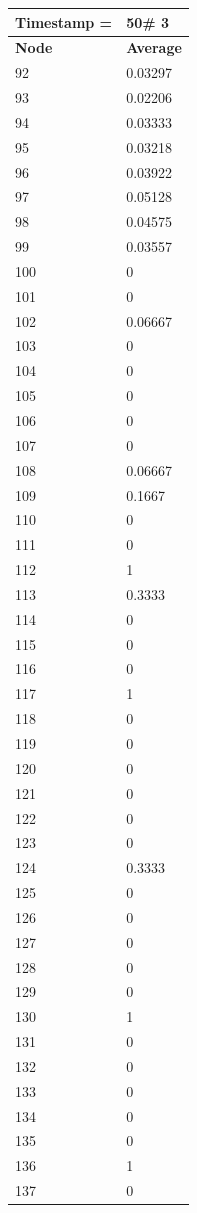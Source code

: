 \begin{tabular}{|l||l|}
\hline
\textbf{Timestamp =} & \textbf{50}\# 3\\\hline
	\textbf{Node} & \textbf{Average} \\ \hline
\hline
	92 & 0.03297 \\ \hline
	93 & 0.02206 \\ \hline
	94 & 0.03333 \\ \hline
	95 & 0.03218 \\ \hline
	96 & 0.03922 \\ \hline
	97 & 0.05128 \\ \hline
	98 & 0.04575 \\ \hline
	99 & 0.03557 \\ \hline
	100 & 0 \\ \hline
	101 & 0 \\ \hline
	102 & 0.06667 \\ \hline
	103 & 0 \\ \hline
	104 & 0 \\ \hline
	105 & 0 \\ \hline
	106 & 0 \\ \hline
	107 & 0 \\ \hline
	108 & 0.06667 \\ \hline
	109 & 0.1667 \\ \hline
	110 & 0 \\ \hline
	111 & 0 \\ \hline
	112 & 1 \\ \hline
	113 & 0.3333 \\ \hline
	114 & 0 \\ \hline
	115 & 0 \\ \hline
	116 & 0 \\ \hline
	117 & 1 \\ \hline
	118 & 0 \\ \hline
	119 & 0 \\ \hline
	120 & 0 \\ \hline
	121 & 0 \\ \hline
	122 & 0 \\ \hline
	123 & 0 \\ \hline
	124 & 0.3333 \\ \hline
	125 & 0 \\ \hline
	126 & 0 \\ \hline
	127 & 0 \\ \hline
	128 & 0 \\ \hline
	129 & 0 \\ \hline
	130 & 1 \\ \hline
	131 & 0 \\ \hline
	132 & 0 \\ \hline
	133 & 0 \\ \hline
	134 & 0 \\ \hline
	135 & 0 \\ \hline
	136 & 1 \\ \hline
	137 & 0 \\ \hline
\end{tabular}

